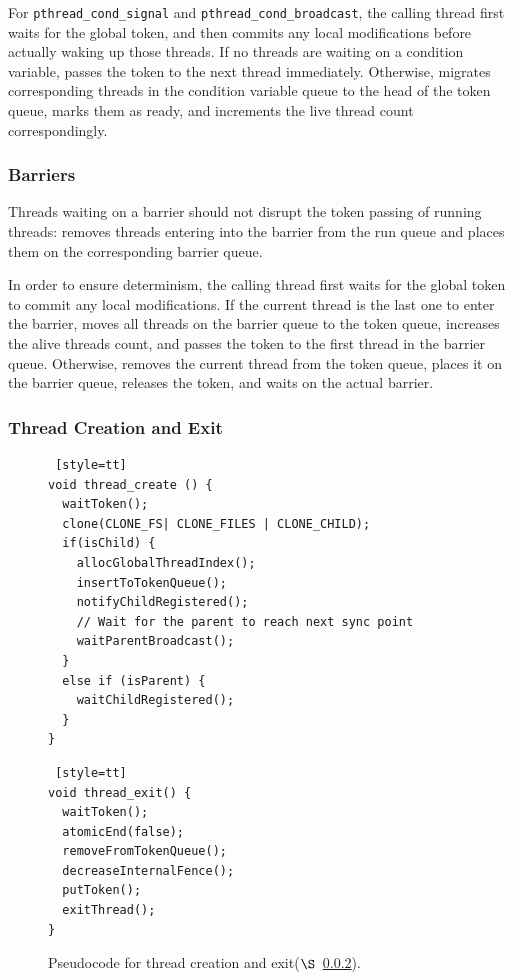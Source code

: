 For \texttt{pthread\_cond\_signal} and \texttt{pthread\_cond\_broadcast}, the calling thread first waits for the global token, and then commits any local modifications before actually waking up those threads. If no threads are waiting on a condition variable, \dthreads{} passes the token to the next thread immediately. Otherwise, \dthreads{} migrates corresponding threads in the condition variable queue to the head of the token queue, marks them as ready, and increments the live thread count correspondingly. 


\subsubsection{Barriers}

\label{sec:barrierwait}

Threads waiting on a barrier should not disrupt the token passing of running threads: \dthreads{} removes threads entering into the barrier from the run queue and places them on the corresponding barrier queue.

In order to ensure determinism, the calling thread first waits for the global token to commit any local modifications. If the current thread is the last one to enter the barrier, \dthreads{} moves all threads on the barrier queue to the token queue, increases the alive threads count, and passes the token to the first thread in the barrier queue. Otherwise, \dthreads{} removes the current thread from the token queue, places it on the barrier queue, releases the token, and waits on the actual barrier.


\subsubsection{Thread Creation and Exit}

\label{sec:threadcreation}

\begin{figure}
\begin{lstlisting} [style=tt]
void thread_create () {
  waitToken();
  clone(CLONE_FS| CLONE_FILES | CLONE_CHILD);
  if(isChild) {
    allocGlobalThreadIndex();
    insertToTokenQueue();
	notifyChildRegistered();
	// Wait for the parent to reach next sync point
    waitParentBroadcast();	
  }
  else if (isParent) {
    waitChildRegistered();
  }
}
\end{lstlisting}
\begin{lstlisting} [style=tt]
void thread_exit() {
  waitToken();
  atomicEnd(false);
  removeFromTokenQueue();
  decreaseInternalFence();
  putToken();
  exitThread(); 
}
\end{lstlisting}
\caption{Pseudocode for thread creation and exit($\S$~\ref{sec:threadcreation}).
\label{fig:threadcreation}
}
\end{figure}


